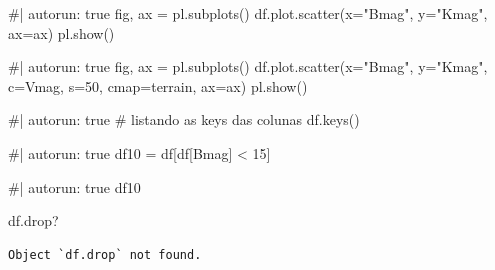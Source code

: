 \documentclass[
  letterpaper,
  DIV=11,
  numbers=noendperiod]{scrreprt}
\newenvironment{Shaded}{\begin{snugshade}}{\end{snugshade}}
\newcommand{\NormalTok}[1]{\textcolor[rgb]{0.00,0.23,0.31}{#1}}
\begin{document}
\begin{Shaded}
\begin{Highlighting}[]
\NormalTok{\#| autorun: true}
\NormalTok{fig, ax = pl.subplots()}
\NormalTok{df.plot.scatter(x="Bmag", y="Kmag", ax=ax)}
\NormalTok{pl.show()}
\end{Highlighting}
\end{Shaded}

\begin{Shaded}
\begin{Highlighting}[]
\NormalTok{\#| autorun: true}
\NormalTok{fig, ax = pl.subplots()}
\NormalTok{df.plot.scatter(x="Bmag", }
\NormalTok{                y="Kmag", }
\NormalTok{                c=\textquotesingle{}Vmag\textquotesingle{},}
\NormalTok{                s=50, }
\NormalTok{                cmap=\textquotesingle{}terrain\textquotesingle{},}
\NormalTok{                ax=ax)}
\NormalTok{pl.show()}
\end{Highlighting}
\end{Shaded}

\begin{Shaded}
\begin{Highlighting}[]
\NormalTok{\#| autorun: true}
\NormalTok{\# listando as keys das colunas}
\NormalTok{df.keys()}
\end{Highlighting}
\end{Shaded}

\begin{Shaded}
\begin{Highlighting}[]
\NormalTok{\#| autorun: true}
\NormalTok{df10 = df[df[\textquotesingle{}Bmag\textquotesingle{}] \textless{} 15]}
\end{Highlighting}
\end{Shaded}

\begin{Shaded}
\begin{Highlighting}[]
\NormalTok{\#| autorun: true}
\NormalTok{df10}
\end{Highlighting}
\end{Shaded}

\begin{Shaded}
\begin{Highlighting}[]
\NormalTok{df.drop?}
\end{Highlighting}
\end{Shaded}

\begin{verbatim}
Object `df.drop` not found.
\end{verbatim}
\end{document}
